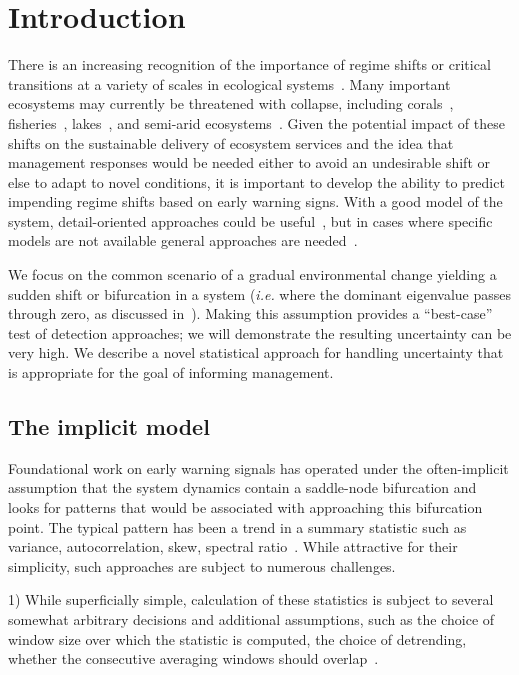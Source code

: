 \documentclass[authoryear,preprint,11pt]{elsarticle}
\begin{document}
\section{Introduction}
There is an increasing recognition of the importance of regime shifts or critical transitions at a variety of scales in ecological systems~\citep{Holling1973, Wissel1984, Scheffer2001, Scheffer2009, Drake2010, Carpenter2011}⁠. 
Many important ecosystems may currently be threatened with collapse, including corals~\citep{Bellwood2004}, fisheries~\citep{Berkes2006}⁠, lakes~\citep{Carpenter2011}, and semi-arid ecosystems~\citep{Kefi2007}⁠. 
Given the potential impact of  these shifts on the sustainable delivery of ecosystem services
and the idea that management responses would be needed either to avoid an undesirable shift or else to adapt to novel conditions,
it is important to develop the ability to predict impending regime shifts based on early warning signs. 
With a good model of the system, detail-oriented approaches could be useful~\citep{Lenton2009},
but in cases where specific models are not available general approaches are needed~\citep{Scheffer2009}⁠.

We focus on the common scenario of a gradual environmental change yielding a sudden shift or bifurcation in a system 
(\emph{i.e.} where the dominant eigenvalue passes through zero,
as discussed in~\citet{Scheffer2001, Scheffer2009}). 
Making this assumption provides a ``best-case'' test of detection approaches;
we will demonstrate the resulting uncertainty can be very high.
We describe a novel statistical approach for handling uncertainty that is appropriate for the goal of informing management.  


\subsection{The implicit model}
Foundational work on early warning signals has operated under the often-implicit assumption
that the system dynamics contain a saddle-node bifurcation and
looks for patterns that would be associated with approaching this bifurcation point.
The typical pattern has been a trend in a summary statistic such as
variance, autocorrelation, skew, spectral ratio~\citep{Biggs2009}.
While attractive for their simplicity, such approaches are subject to numerous challenges.

1) While superficially simple, calculation of these statistics is subject to 
several somewhat arbitrary decisions and additional assumptions,
such as the choice of window size over which the statistic is computed,
the choice of detrending,
whether the consecutive averaging windows should overlap~\citep[\emph{e.g.}][]{Lenton2012}. %
\end{document}

